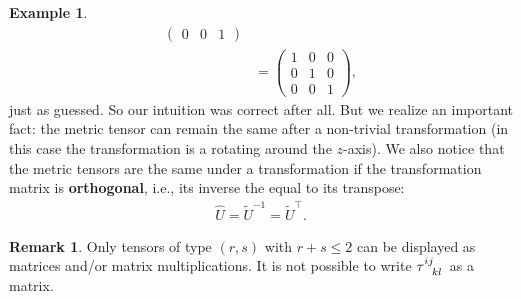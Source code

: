 \documentclass{article}
\theoremstyle{definition}
\newtheorem{rmk}{Remark}[section]
\newtheorem{exmp}{Example}[section]
\begin{document}
\begin{exmp}
\begin{align*}
\begin{pmatrix}
	0 & 0 & 1
	\end{pmatrix}\\
	&=
	\begin{pmatrix}
	1 & 0 & 0\\
	0 & 1 & 0\\
	0 & 0 & 1
	\end{pmatrix},
	\end{align*}
	just as guessed. So our intuition was correct after all. But we realize an important fact: the metric tensor can remain the same after a non-trivial transformation (in this case the transformation is a rotating around the $z$-axis). We also notice that the metric tensors are the same under a transformation if the transformation matrix is \textbf{orthogonal}, i.e., its inverse the equal to its transpose:
	\begin{align*}
	\hat{U} = \tilde{U}^{-1} = \tilde{U}^\top.
	\end{align*}
\end{exmp}

\begin{rmk}
	Only tensors of type $(r,s)$ with $r+s \leq 2$ can be displayed as matrices and/or matrix multiplications. It is not possible to write $\tensor{\tau}{^{ij}_{kl}}$ as a matrix. 
\end{rmk}
\end{document}
